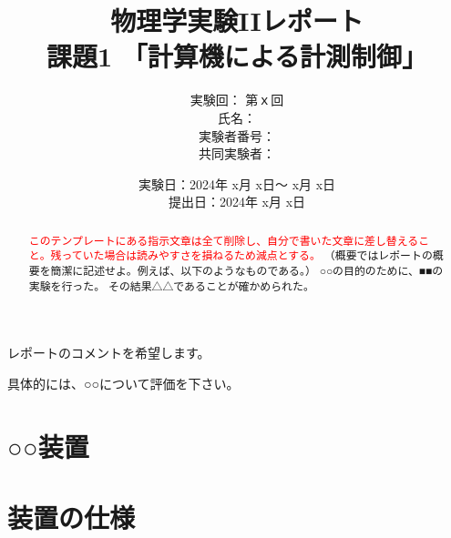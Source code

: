 \documentclass[uplatex,dvipdfmx,a4j,12pt]{jsarticle}
\title{
  物理学実験IIレポート\\    %
  課題1 「計算機による計測制御」
  }
\author{
  実験回： 第ｘ回 \\
  氏名： \\
  実験者番号：
  \\
  共同実験者：
  }
\date{
  実験日：2024年 x月 x日～ x月 x日 \\
  提出日：2024年 x月 x日}  %
\begin{document}
\maketitle


\vspace{2em}
\begin{center}
    \begin{minipage}{0.5\linewidth}
        レポートのコメントを希望します。

        具体的には、○○について評価を下さい。
    \end{minipage}
\end{center}

\vspace{5em}  


%
\begin{abstract}
    \textcolor{red}{このテンプレートにある指示文章は全て削除し、自分で書いた文章に差し替えること。残っていた場合は読みやすさを損ねるため減点とする。}
    （概要ではレポートの概要を簡潔に記述せよ。例えば、以下のようなものである。）
    ○○の目的のために、■■の実験を行った。
    その結果△△であることが確かめられた。
\end{abstract}

\newpage

\section{○○装置}

\section{装置の仕様}
\end{document}
